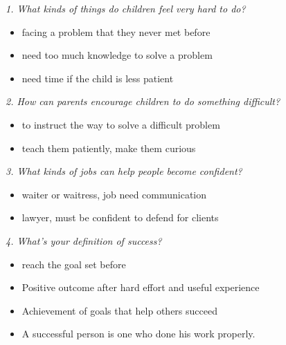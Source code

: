 \documentclass[conference]{IEEEtran}
\begin{document}
\textit{1. What kinds of things do children feel very hard to do?}
\begin{itemize}
    \item facing a problem that they never met before
    \item need too much knowledge to solve a problem
    \item need time if the child is less patient
\end{itemize}

\textit{2. How can parents encourage children to do something difficult?}
\begin{itemize}
    \item to instruct the way to solve a difficult problem
    \item teach them patiently, make them curious
\end{itemize}

\textit{3. What kinds of jobs can help people become confident?}
\begin{itemize}
    \item waiter or waitress, job need communication
    \item lawyer, must be confident to defend for clients 
\end{itemize}

\textit{4. What's your definition of success?}
\begin{itemize}
    \item reach the goal set before
    \item Positive outcome after hard effort and useful experience
    \item Achievement of goals that help others succeed
    \item A successful person is one who done his work properly.
\end{itemize}
\end{document}
